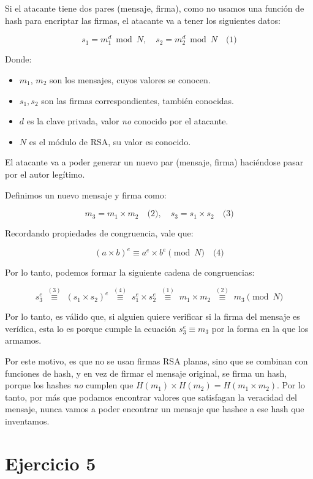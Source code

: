 \documentclass[12pt]{article}
\begin{document}
Si el atacante tiene dos pares (mensaje, firma), como no usamos una función de hash para encriptar las firmas, el atacante va a tener los siguientes datos:

\[
s_1 = m_1^d \bmod N, \quad s_2 = m_2^d \bmod N \quad \text{(1)}
\]

Donde:

\begin{itemize}
    \item $m_1$, $m_2$ son los mensajes, cuyos valores se conocen.
    \item $s_1, s_2$ son las firmas correspondientes, también conocidas.
    \item $d$ es la clave privada, valor \emph{no} conocido por el atacante.
    \item $N$ es el módulo de RSA, su valor es conocido.
\end{itemize}

El atacante va a poder generar un nuevo par (mensaje, firma) haciéndose pasar por el autor legítimo.

Definimos un nuevo mensaje y firma como:

\[
m_3 = m_1 \times m_2 \quad \text{(2)}, \quad s_3 = s_1 \times s_2 \quad \text{(3)}
\]

Recordando propiedades de congruencia, vale que:

\[
(a \times b)^e \equiv a^e \times b^e \pmod{N} \quad \text{(4)}
\]

Por lo tanto, podemos formar la siguiente cadena de congruencias:

\[
s_3^e \;\overset{(3)}{\equiv}\; (s_1 \times s_2)^e \;\overset{(4)}{\equiv}\; s_1^e \times s_2^e \;\overset{(1)}{\equiv}\; m_1 \times m_2 \;\overset{(2)}{\equiv}\; m_3 \pmod{N}
\]

Por lo tanto, es válido que, si alguien quiere verificar si la firma del mensaje es verídica, esta lo es porque cumple la ecuación $s_3^e \equiv m_3$ por la forma en la que los armamos.

Por este motivo, es que no se usan firmas RSA planas, sino que se combinan con funciones de hash, y en vez de firmar el mensaje original, se firma un hash, porque los hashes \emph{no} cumplen que $H(m_1) \times H(m_2) = H(m_1 \times m_2)$. Por lo tanto, por más que podamos encontrar valores que satisfagan la veracidad del mensaje, nunca vamos a poder encontrar un mensaje que hashee a ese hash que inventamos.

\section*{Ejercicio 5}
\end{document}
